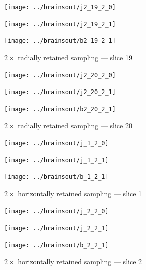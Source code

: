 \documentclass{article}
\begin{document}
\begin{figure}
\begin{centering}

\parbox{\imsizes}{\texttt{[image: ../brainsout/j2\_19\_2\_0]}}

\vspace{\vertseps}

\parbox{\imsizes}{\texttt{[image: ../brainsout/j2\_19\_2\_1]}}
\hfill
\parbox{\imsizes}{\texttt{[image: ../brainsout/b2\_19\_2\_1]}}

\end{centering}
\caption{$2\times$ radially retained sampling --- slice 19}
\end{figure}


\begin{figure}
\begin{centering}

\parbox{\imsizes}{\texttt{[image: ../brainsout/j2\_20\_2\_0]}}

\vspace{\vertseps}

\parbox{\imsizes}{\texttt{[image: ../brainsout/j2\_20\_2\_1]}}
\hfill
\parbox{\imsizes}{\texttt{[image: ../brainsout/b2\_20\_2\_1]}}

\end{centering}
\caption{$2\times$ radially retained sampling --- slice 20}
\end{figure}


\begin{figure}
\begin{centering}

\parbox{\imsizes}{\texttt{[image: ../brainsout/j\_1\_2\_0]}}

\vspace{\vertseps}

\parbox{\imsizes}{\texttt{[image: ../brainsout/j\_1\_2\_1]}}
\hfill
\parbox{\imsizes}{\texttt{[image: ../brainsout/b\_1\_2\_1]}}

\end{centering}
\caption{$2\times$ horizontally retained sampling --- slice 1}
\end{figure}


\begin{figure}
\begin{centering}

\parbox{\imsizes}{\texttt{[image: ../brainsout/j\_2\_2\_0]}}

\vspace{\vertseps}

\parbox{\imsizes}{\texttt{[image: ../brainsout/j\_2\_2\_1]}}
\hfill
\parbox{\imsizes}{\texttt{[image: ../brainsout/b\_2\_2\_1]}}

\end{centering}
\caption{$2\times$ horizontally retained sampling --- slice 2}
\end{figure}
\end{document}
